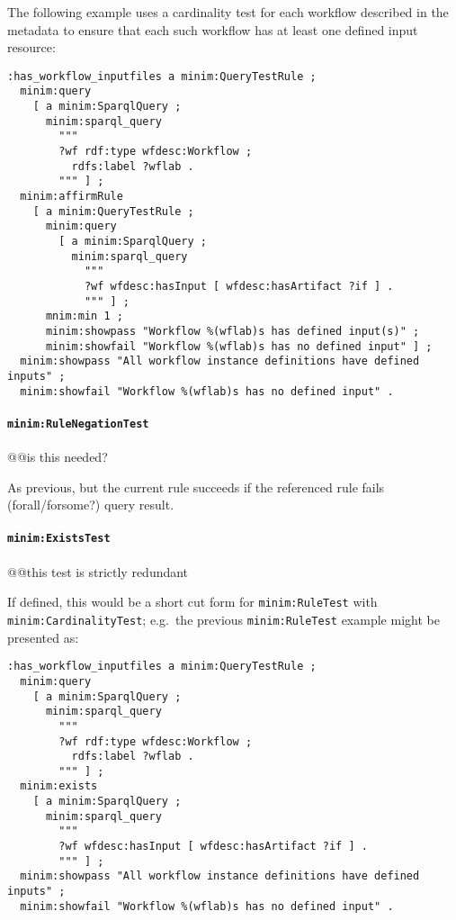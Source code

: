 \documentclass[]{article}
\begin{document}
The following example uses a cardinality test for each workflow
described in the metadata to ensure that each such workflow has at least
one defined input resource:

\begin{verbatim}
:has_workflow_inputfiles a minim:QueryTestRule ;
  minim:query 
    [ a minim:SparqlQuery ; 
      minim:sparql_query 
        """
        ?wf rdf:type wfdesc:Workflow ;
          rdfs:label ?wflab .
        """ ] ;
  minim:affirmRule
    [ a minim:QueryTestRule ;
      minim:query
        [ a minim:SparqlQuery ; 
          minim:sparql_query 
            """
            ?wf wfdesc:hasInput [ wfdesc:hasArtifact ?if ] .
            """ ] ;
      mnim:min 1 ;
      minim:showpass "Workflow %(wflab)s has defined input(s)" ;
      minim:showfail "Workflow %(wflab)s has no defined input" ] ;
  minim:showpass "All workflow instance definitions have defined inputs" ;
  minim:showfail "Workflow %(wflab)s has no defined input" .
\end{verbatim}

\paragraph{\texttt{minim:RuleNegationTest}}

@@is this needed?

As previous, but the current rule succeeds if the referenced rule fails
(forall/forsome?) query result.

\paragraph{\texttt{minim:ExistsTest}}

@@this test is strictly redundant

If defined, this would be a short cut form for \texttt{minim:RuleTest}
with \texttt{minim:CardinalityTest}; e.g.~the previous
\texttt{minim:RuleTest} example might be presented as:

\begin{verbatim}
:has_workflow_inputfiles a minim:QueryTestRule ;
  minim:query 
    [ a minim:SparqlQuery ; 
      minim:sparql_query 
        """
        ?wf rdf:type wfdesc:Workflow ;
          rdfs:label ?wflab .
        """ ] ;
  minim:exists
    [ a minim:SparqlQuery ; 
      minim:sparql_query 
        """
        ?wf wfdesc:hasInput [ wfdesc:hasArtifact ?if ] .
        """ ] ;
  minim:showpass "All workflow instance definitions have defined inputs" ;
  minim:showfail "Workflow %(wflab)s has no defined input" .
\end{verbatim}
\end{document}
